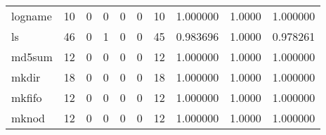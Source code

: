 \begin{tabular}{lrrrrrrrrr}
logname   &                                       10 &                                                  0 &                                                  0 &                                                  0 &                                                  0 &                                                 10 &                                           1.000000 &                                 1.0000 &                             1.000000 \\
ls        &                                       46 &                                                  0 &                                                  1 &                                                  0 &                                                  0 &                                                 45 &                                           0.983696 &                                 1.0000 &                             0.978261 \\
md5sum    &                                       12 &                                                  0 &                                                  0 &                                                  0 &                                                  0 &                                                 12 &                                           1.000000 &                                 1.0000 &                             1.000000 \\
mkdir     &                                       18 &                                                  0 &                                                  0 &                                                  0 &                                                  0 &                                                 18 &                                           1.000000 &                                 1.0000 &                             1.000000 \\
mkfifo    &                                       12 &                                                  0 &                                                  0 &                                                  0 &                                                  0 &                                                 12 &                                           1.000000 &                                 1.0000 &                             1.000000 \\
mknod     &                                       12 &                                                  0 &                                                  0 &                                                  0 &                                                  0 &                                                 12 &                                           1.000000 &                                 1.0000 &                             1.000000 \\

\end{tabular}
